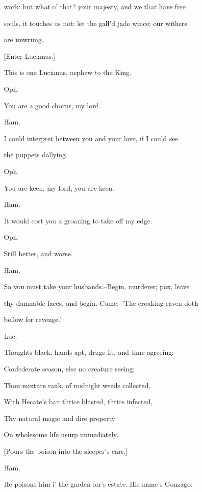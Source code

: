 \documentclass[12pt]{book}
\begin{document}
work: but what o' that? your majesty, and we that have free

souls, it touches us not: let the gall'd jade wince; our withers

are unwrung.



[Enter Lucianus.]



This is one Lucianus, nephew to the King.



Oph.

You are a good chorus, my lord.



Ham.

I could interpret between you and your love, if I could see

the puppets dallying.



Oph.

You are keen, my lord, you are keen.



Ham.

It would cost you a groaning to take off my edge.



Oph.

Still better, and worse.



Ham.

So you must take your husbands.--Begin, murderer; pox, leave

thy damnable faces, and begin. Come:--'The croaking raven doth

bellow for revenge.'



Luc.

Thoughts black, hands apt, drugs fit, and time agreeing;

Confederate season, else no creature seeing;

Thou mixture rank, of midnight weeds collected,

With Hecate's ban thrice blasted, thrice infected,

Thy natural magic and dire property

On wholesome life usurp immediately.



[Pours the poison into the sleeper's ears.]



Ham.

He poisons him i' the garden for's estate. His name's Gonzago:
\end{document}
